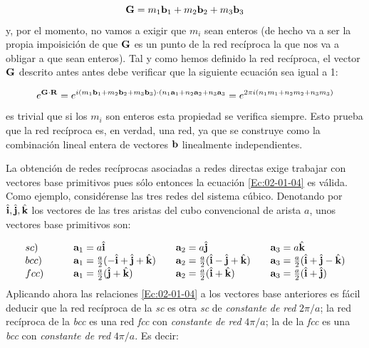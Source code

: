 \begin{equation}
	\mathbf{G} = m_1 \mathbf{b}_1 + m_2 \mathbf{b}_2 + m_3 \mathbf{b}_3
\end{equation}
y, por el momento, no vamos a exigir que $m_i$ sean enteros (de hecho va a ser la propia impoisición de que $\mathbf{G}$ es un punto de la red recíproca la que nos va a obligar a que sean enteros). Tal y como hemos definido la red recíproca, el vector $\mathbf{G}$ descrito antes antes debe verificar que la siguiente ecuación sea igual a 1:

\begin{equation*}
	e^{\mathbf{G}\cdot \mathbf{R}} = e^{i (m_1 \mathbf{b}_1 + m_2 \mathbf{b}_2 +m_3 \mathbf{b}_3)\cdot(n_1 \mathbf{a}_1 +n_2 \mathbf{a}_2 +n_3 \mathbf{a}_3}=e^{2\pi i (n_1m_1+n_2m_2+n_3m_3)}
\end{equation*}
es trivial que si los $m_i$ son enteros esta propiedad se verifica siempre. Esto prueba que la red recíproca es, en verdad, una red, ya que se construye como la combinación lineal entera de vectores $\mathbf{b}$ linealmente independientes. 

La obtención de redes recíprocas asociadas a redes directas exige trabajar con vectores base primitivos pues sólo entonces la ecuación \ref{Ec:02-01-04} es válida. Como ejemplo, considérense las tres redes del sistema cúbico. Denotando por $\hat{\mathbf{i}}, \hat{\mathbf{j}}, \hat{\mathbf{k}}$ los vectores de las tres aristas del cubo convencional de arista $a$, unos vectores base primitivos son:

\begin{equation*}
	\begin{array}{llll}
		sc) \quad &  \quad \mathbf{a}_1 = a \hat{\mathbf{i}} & \quad \mathbf{a}_2 = a \hat{\mathbf{j}} & \quad \mathbf{a}_3 = a \hat{\mathbf{k}} \\
		bcc)  \quad & \quad \mathbf{a}_1 = \frac{a}{2} (-\hat{\mathbf{i}}+\hat{\mathbf{j}}+\hat{\mathbf{k}}) & \quad \mathbf{a}_2 = \frac{a}{2} (\hat{\mathbf{i}}-\hat{\mathbf{j}}+\hat{\mathbf{k}})  & \quad \mathbf{a}_3 = \frac{a}{2} (\hat{\mathbf{i}}+\hat{\mathbf{j}}-\hat{\mathbf{k}})  \\
		fcc) \quad & \quad \mathbf{a}_1 = \frac{a}{2} (\hat{\mathbf{j}} + \hat{\mathbf{k}}) & \quad \mathbf{a}_2 = \frac{a}{2} (\hat{\mathbf{i}} + \hat{\mathbf{k}}) & \quad \mathbf{a}_3 = \frac{a}{2} (\hat{\mathbf{i}} + \hat{\mathbf{j}}) \\
	\end{array}
\end{equation*}
Aplicando ahora las relaciones \ref{Ec:02-01-04} a los vectores base anteriores es fácil deducir que la red recíproca de la \textit{sc} es otra \textit{sc} de \textit{constante de red} $2\pi/a$; la red recíproca de la \textit{bcc} es una red \textit{fcc} con \textit{constante de red} $4\pi/a$; la de la \textit{fcc} es una \textit{bcc} con \textit{constante de red} $4 \pi/a$. Es decir:


